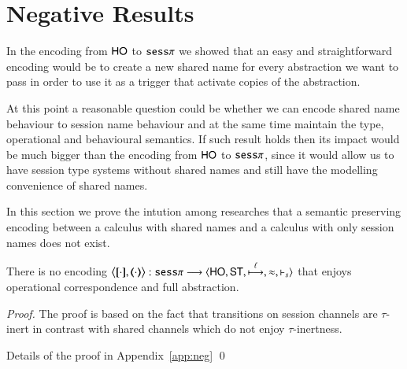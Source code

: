 \section{Negative Results}

In the encoding from $\mathsf{HO}$ to $\mathtt{sess}\pi$ we showed that
an easy and straightforward encoding would be to create
a new shared name for every abstraction we want to pass
in order to use it as a trigger that activate copies of
the abstraction.

At this point a reasonable question could be whether we can
encode shared name behaviour to session name behaviour and at
the same time maintain the type, operational and behavioural semantics.
If such result holds then its impact would be much bigger than
the encoding from $\mathsf{HO}$ to $\mathtt{sess}\pi$, since it would
allow us to have session type systems without shared names
and still have the modelling convenience of shared names.

In this section we prove the intution among researches 
that a semantic preserving encoding between a calculus
with shared names and a calculus with only session names
does not exist.

\begin{theorem}\rm
	There is no encoding $\enc{\cdot}{\cdot}: \sessp \longrightarrow \lrangle{\HO, \mathsf{ST}, \hby{\ell}, \wb, \proves_s}$
	that enjoys operational correspondence and full abstraction.
\end{theorem}

\begin{proof}
	The proof is based on the fact that
	transitions on session channels are
	$\tau$-inert in contrast with shared
	channels which do not enjoy
	$\tau$-inertness.

	Details of the proof in Appendix~\ref{app:neg}
	\qed
\end{proof}
